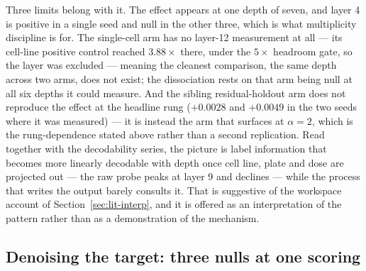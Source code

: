 Three limits belong with it. The effect appears at one depth of seven, and layer 4 is positive in a
single seed and null in the other three, which is what multiplicity discipline is for. The
single-cell arm has no layer-12 measurement at all --- its cell-line positive control reached
$3.88\times$ there, under the $5\times$ headroom gate, so the layer was excluded --- meaning the
cleanest comparison, the same depth across two arms, does not exist; the dissociation rests on that
arm being null at all six depths it could measure. And the sibling residual-holdout arm does not
reproduce the effect at the headline rung ($+0.0028$ and $+0.0049$ in the two seeds where it was
measured) --- it is instead the arm that surfaces at $\alpha = 2$, which is the rung-dependence
stated above rather than a second replication. Read together
with the decodability series, the picture is label information that becomes more linearly decodable with depth
once cell line, plate and dose are projected out --- the raw probe peaks at layer 9 and declines ---
while the process that writes the output barely consults it. That is suggestive of the workspace
account of Section~\ref{sec:lit-interp}, and it is offered as an interpretation of the pattern
rather than as a demonstration of the mechanism.

\subsection{Denoising the target: three nulls at one scoring}
\label{sec:res-epsilon}

